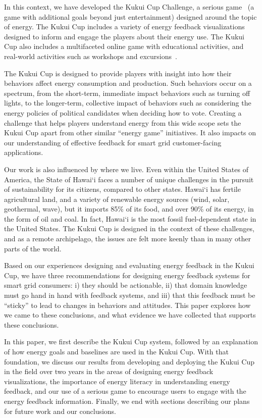 \documentclass[10pt, conference, compsocconf]{IEEEtran-old}
\begin{document}
In this context, we have developed the Kukui Cup Challenge, a serious game~\cite{Zyda2005} (a game with additional goals beyond just entertainment) designed around the topic of energy. The Kukui Cup includes a variety of energy feedback visualizations~\cite{Froehlich2010} designed to inform and engage the players about their energy use. The Kukui Cup also includes a multifaceted online game with educational activities, and real-world activities such as workshops and excursions~\cite{csdl2-10-07, csdl2-10-08}.

The Kukui Cup is designed to provide players with insight into how their behaviors affect energy consumption and production. Such behaviors occur on a spectrum, from the short-term, immediate impact behaviors such as turning off lights, to the longer-term, collective impact of behaviors such as considering the energy policies of political candidates when deciding how to vote. Creating a challenge that helps players understand energy from this wide scope sets the Kukui Cup apart from other similar ``energy game'' initiatives. It also impacts on our understanding of effective feedback for smart grid customer-facing applications.

Our work is also influenced by where we live. Even within the United States of America, the State of Hawai`i faces a number of unique challenges in the pursuit of sustainability for its citizens, compared to other states. Hawai`i has fertile agricultural land, and a variety of renewable energy sources (wind, solar, geothermal, wave), but it imports 85\% of its food, and over 90\% of its energy, in the form of oil and coal. In fact, Hawai`i is the most fossil fuel-dependent state in the United States. The Kukui Cup is designed in the context of these challenges, and as a remote archipelago, the issues are felt more keenly than in many other parts of the world.

Based on our experiences designing and evaluating energy feedback in the Kukui Cup, we have three recommendations for designing energy feedback systems for smart grid consumers: i) they should be actionable, ii) that domain knowledge must go hand in hand with feedback systems, and iii) that this feedback must be ``sticky'' to lead to changes in behaviors and attitudes. This paper explores how we came to these conclusions, and what evidence we have collected that supports these conclusions.

In this paper, we first describe the Kukui Cup system, followed by an explanation of how energy goals and baselines are used in the Kukui Cup. With that foundation, we discuss our results from developing and deploying the Kukui Cup in the field over two years in the areas of designing energy feedback visualizations, the importance of energy literacy in understanding energy feedback, and our use of a serious game to encourage users to engage with the energy feedback information. Finally, we end with sections describing our plans for future work and our conclusions.
\end{document}
